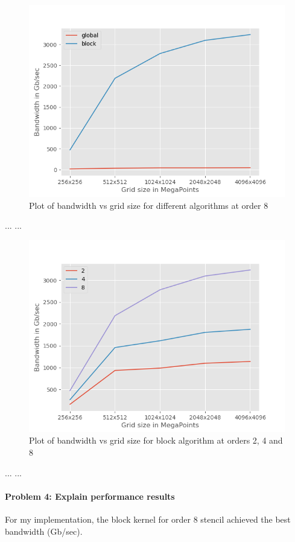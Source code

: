 \documentclass[12pt,letterpaper,twoside]{article}
\begin{document}
\begin{figure}[h]
    \center
    \includegraphics[scale=0.7]{bandwidth_by_alg_ord8.png}
    \caption{Plot of bandwidth vs grid size for different algorithms at order 8}
\end{figure}

...
...

\begin{figure}[h]
    \center
    \includegraphics[scale=0.7]{bandwidth_by_order_block.png}
    \caption{Plot of bandwidth vs grid size for block algorithm at orders 2, 4 and 8}
\end{figure}

...
...


\paragraph{Problem 4: Explain performance results } For my implementation, the block
kernel for order 8 stencil achieved the best bandwidth (Gb/sec). 
\end{document}
